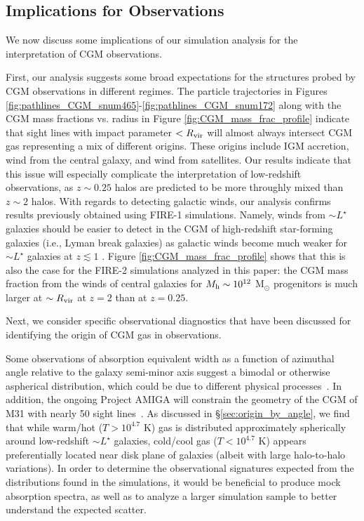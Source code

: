 \documentclass[fleqn,usenatbib]{mnras}
\begin{document}
\subsection{Implications for Observations}
We now discuss some implications of our simulation analysis for the interpretation of CGM observations. 

First, our analysis suggests some broad expectations for the structures probed by CGM observations in different regimes. 
The particle trajectories in Figures \ref{fig:pathlines_CGM_snum465}-\ref{fig:pathlines_CGM_snum172} along with the CGM mass fractions vs. radius in Figure \ref{fig:CGM_mass_frac_profile} indicate that sight lines with impact parameter $<R_{\rm vir}$ will almost always intersect CGM gas representing a mix of different origins. 
These origins include IGM accretion, wind from the central galaxy, and wind from satellites. 
Our results indicate that this issue will especially complicate the interpretation of low-redshift observations, as $z \sim 0.25$ halos are predicted to be more throughly mixed than $z\sim 2$ halos. 
With regards to detecting galactic winds, our analysis confirms results previously obtained using FIRE-1 simulations. 
Namely, winds from $\sim L^{\star}$ galaxies should be easier to detect in the CGM of high-redshift star-forming galaxies (i.e., Lyman break galaxies) as galactic winds become much weaker for $\sim L^{\star}$ galaxies at $z \lesssim 1$ \citep[e.g.,][]{Muratov2015, Angles-Alcazar2017}. 
Figure \ref{fig:CGM_mass_frac_profile} shows that this is also the case for the FIRE-2 simulations analyzed in this paper: the CGM mass fraction from the winds of central galaxies for $M_{\rm h} \sim 10^{12}$ M$_{\odot}$ progenitors is much larger at $\sim R_{\rm vir}$ at $z=2$ than at $z=0.25$.

Next, we consider specific observational diagnostics that have been discussed for identifying the origin of CGM gas in observations. 

Some observations of absorption equivalent width as a function of azimuthal angle relative to the galaxy semi-minor axis suggest a bimodal or otherwise aspherical distribution, which could be due to different physical processes~\citep[e.g.,][]{Bordoloi2011,Bouche2012,Bordoloi2014,Kacprzak2015,Ho2016}.
In addition, the ongoing Project AMIGA will constrain the geometry of the CGM of M31 with nearly 50 sight lines~\citep[][]{2015ApJ...804...79L, Howk2017}. 
As discussed in \S\ref{sec:origin_by_angle}, we find that while warm/hot ($T > 10^{4.7}$ K) gas is distributed approximately spherically around low-redshift $\sim L^{\star}$ galaxies, cold/cool gas ($T < 10^{4.7}$ K) appears preferentially located near disk plane of galaxies (albeit with large halo-to-halo variations).
In order to determine the observational signatures expected from the distributions found in the simulations, it would be beneficial to produce mock absorption spectra, as well as to analyze a larger simulation sample to better understand the expected scatter.
\end{document}
